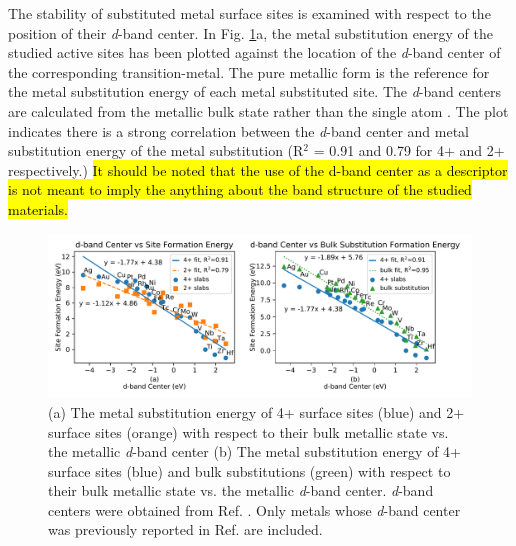 The stability of substituted metal surface sites is examined with respect to the position of their \textit{d}-band center. In Fig. \ref{fig:d_band}a, the metal substitution energy of the studied active sites has been plotted against the location of the \textit{d}-band center of the corresponding transition-metal. The pure metallic form is the reference for the metal substitution energy of each metal substituted site. The \textit{d}-band centers are calculated from the metallic bulk state rather than the single atom \cite{Ruban_1997}. The plot indicates there is a strong correlation between the \textit{d}-band center and metal substitution energy of the metal substitution (R$^2$ = 0.91 and 0.79 for 4+ and 2+ respectively.) \hl{It should be noted that the use of the d-band center as a descriptor is not meant to imply the anything about the band structure of the studied materials.} 
\begin{figure}
    \centering
    \includegraphics[width=0.9\linewidth]{Images/d_band_vs_formation.pdf}
    \caption{(a) The metal substitution energy of 4+ surface sites (blue) and 2+ surface sites (orange) with respect to their bulk metallic state vs. the metallic \textit{d}-band center (b) The metal substitution energy of 4+ surface sites (blue) and bulk substitutions (green) with respect to their bulk metallic state vs. the metallic \textit{d}-band center. \textit{d}-band centers were obtained from Ref. . Only metals whose \textit{d}-band center was previously reported in Ref.  are included.}
    \label{fig:d_band}
\end{figure}


